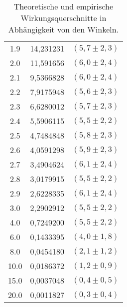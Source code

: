 \begin{table}
\begin{tabular}{c|c|c}
 1.9 & 14,231231 & $(5,7\pm2,3)$\\

 2.0 & 11,591656 & $(6,0\pm2,4)$\\

 2.1 & 9,5366828 & $(6,0\pm2,4)$\\

 2.2 & 7,9175948 & $(5,6\pm2,3)$\\

 2.3 & 6,6280012 & $(5,7\pm2,3)$\\

 2.4 & 5,5906115 & $(5,5\pm2,2)$\\

 2.5 & 4,7484848 & $(5,8\pm2,3)$\\

 2.6 & 4,0591298 & $(5,9\pm2,3)$\\

 2.7 & 3,4904624 & $(6,1\pm2,4)$\\

 2.8 & 3,0179915 & $(5,5\pm2,2)$\\

 2.9 & 2,6228335 & $(6,1\pm2,4)$\\

 3.0 & 2,2902912 & $(5,5\pm2,2)$\\

 4.0 & 0,7249200 & $(5,5\pm2,2)$\\

 6.0 & 0,1433395 & $(4,0\pm1,8)$\\

 8.0 & 0,0454180 & $(2,1\pm1,2)$\\

10.0 & 0,0186372 & $(1,2\pm0,9)$\\

15.0 & 0,0037048 & $(0,4\pm0,5)$\\

20.0 & 0,0011827 & $(0,3\pm0,4)$\\

\bottomrule
\end{tabular}

\caption{Theoretische und empirische Wirkungsquerschnitte in Abhängigkeit von den Winkeln.}
\label{tab:WQ}
\end{table}

